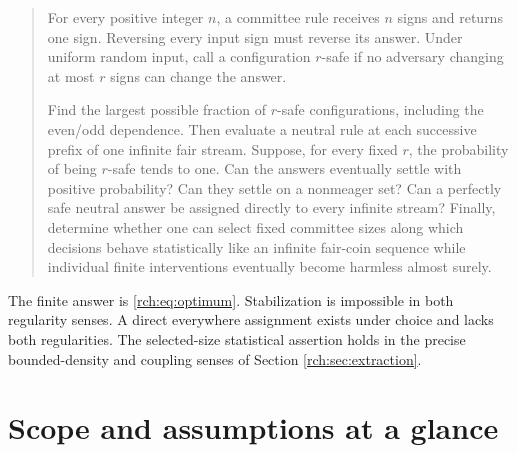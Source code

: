 \documentclass[11pt]{article}
\theoremstyle{definition}
\theoremstyle{remark}
\begin{document}
\begin{quote}
For every positive integer \(n\), a committee rule receives \(n\) signs and
returns one sign. Reversing every input sign must reverse its answer. Under
uniform random input, call a configuration \(r\)-safe if no adversary changing
at most \(r\) signs can change the answer.

Find the largest possible fraction of \(r\)-safe configurations, including the
even/odd dependence. Then evaluate a neutral rule at each successive prefix of
one infinite fair stream. Suppose, for every fixed \(r\), the probability of
being \(r\)-safe tends to one. Can the answers eventually settle with positive
probability? Can they settle on a nonmeager set? Can a perfectly safe neutral
answer be assigned directly to every infinite stream? Finally, determine whether
one can select fixed committee sizes along which decisions behave statistically
like an infinite fair-coin sequence while individual finite interventions
eventually become harmless almost surely.
\end{quote}

The finite answer is \eqref{rch:eq:optimum}. Stabilization is impossible in both
regularity senses. A direct everywhere assignment exists under choice and lacks
both regularities. The selected-size statistical assertion holds in the precise
bounded-density and coupling senses of Section \ref{rch:sec:extraction}.

\section{Scope and assumptions at a glance}
\end{document}
